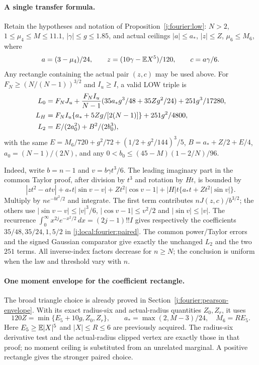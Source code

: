 \paragraph{A single transfer formula.}
Retain the hypotheses and notation of Proposition~\ref{j:fourier:low}:
$N>2$, $1\le\mu_4\le M\le11.1$, $|\gamma|\le g\le1.85$, and actual
ceilings $|a|\le a_*$, $|z|\le Z$, $\mu_6\le M_6$, where
\[
 a=(3-\mu_4)/24,\qquad z=(10\gamma-\mathbb E X^5)/120,
 \qquad c=a\gamma/6.
\]
Any rectangle containing the actual pair $(z,c)$ may be used above.
For $F_N\ge(N/(N-1))^{3/2}$ and $I_u\ge I$, a valid LOW triple is
\begin{align}\label{j:local:fourier:paired}
 L_0&=F_NJ_u+\frac{F_NI_u}{N-1}
       (35a_*g^3/48+35Zg^2/24)+251g^3/17280,\\
 L_H&=F_NI_u\{a_*+5Zg/[2(N-1)]\}+251g^2/4800,\notag\\
 L_2&=E/(2a_0^2)+B^2/(2b_0^3),\notag
\end{align}
with the same $E=M_6/720+g^2/72+(1/2+g^2/144)^3/5$,
$B=a_*+Z/2+E/4$, $a_0=(N-1)/(2N)$, and any
$0<b_0\le(45-M)(1-2/N)/96$.

Indeed, write $b=n-1$ and $v=b\gamma t^3/6$. The leading imaginary
part in the common Taylor proof, after division by $t^3$ and rotation
by $Ht$, is bounded by
\[
 |zt^2-atv|+a_*t|\sin v-v|+Zt^2|\cos v-1|
       +|H|t\{a_*t+Zt^2|\sin v|\}.
\]
Multiply by $ne^{-bt^2/2}$ and integrate. The first term contributes
$nJ(z,c)/b^{3/2}$; the others use
$|\sin v-v|\le|v|^3/6$, $|\cos v-1|\le v^2/2$ and
$|\sin v|\le|v|$. The recurrence
$\int_0^\infty x^{2j}e^{-x^2/2}\,dx=(2j-1)!!I$
gives respectively the coefficients $35/48,35/24,1,5/2$ in
\eqref{j:local:fourier:paired}. The common power/Taylor errors and
the signed Gaussian comparator give exactly the unchanged $L_2$ and
the two $251$ terms. All inverse-index factors decrease for $n\ge N$;
the conclusion is uniform when the law and threshold vary with $n$.

\paragraph{One moment envelope for the coefficient rectangle.}
The broad triangle choice is already proved in
Section~\ref{j:fourier:pearson-envelope}. With its exact radius-six
and actual-radius quantities $Z_0,Z_r$, it uses
\begin{equation}\label{j:local:fourier:z0}
 120Z=\min\{E_5+10g,Z_0,Z_r\},\qquad
 a_*=\max(2,M-3)/24,\quad M_6=RE_5.
\end{equation}
Here $E_5\ge\mathbb E|X|^5$ and $|X|\le R\le6$ are previously acquired.
The radius-six derivative test and the actual-radius clipped vertex
are exactly those in that proof; no moment ceiling is substituted
from an unrelated marginal. A positive rectangle gives the stronger
paired choice.

